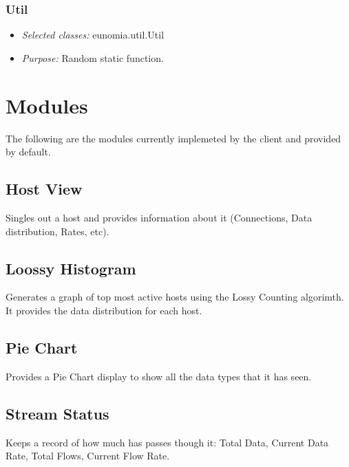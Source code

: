 \documentclass[titlepage,12pt]{article}
\begin{document}
\subsubsection{Util}
\begin{itemize}
\item \emph{Selected classes:} eunomia.util.Util
\item \emph{Purpose:} Random static function.
\end{itemize}

\section{Modules}

The following are the modules currently implemeted by the client and provided by default.

\subsection{Host View}

Singles out a host and provides information about it (Connections, Data distribution, Rates, etc).

\subsection{Loossy Histogram}

Generates a graph of top most active hosts using the Lossy Counting algorimth. It provides the data distribution for each host.

\subsection{Pie Chart}

Provides a Pie Chart display to show all the data types that it has seen.

\subsection{Stream Status}

Keeps a record of how much has passes though it: Total Data, Current Data Rate, Total Flows, Current Flow Rate.
\end{document}
